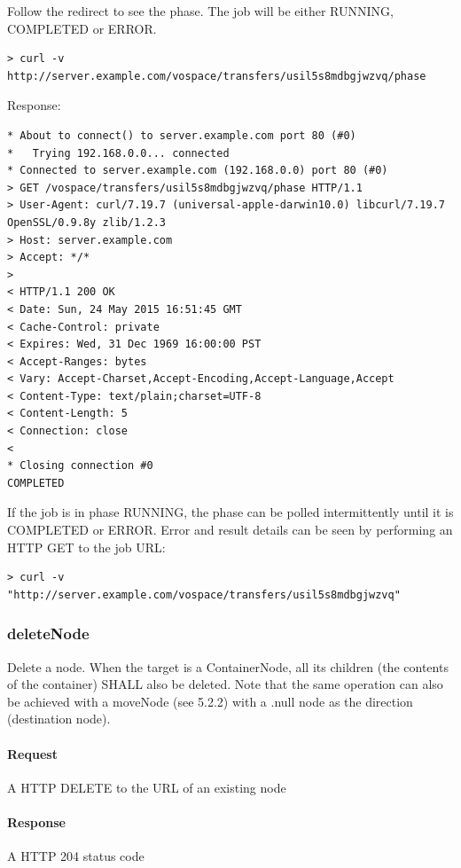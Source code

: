 \documentclass[11pt,a4paper]{ivoa}
\begin{document}
Follow the redirect to see the phase.  The job will be either RUNNING, COMPLETED or ERROR.
\begin{lstlisting}
> curl -v http://server.example.com/vospace/transfers/usil5s8mdbgjwzvq/phase
\end{lstlisting}
Response:
\begin{lstlisting}
* About to connect() to server.example.com port 80 (#0)
*   Trying 192.168.0.0... connected
* Connected to server.example.com (192.168.0.0) port 80 (#0)
> GET /vospace/transfers/usil5s8mdbgjwzvq/phase HTTP/1.1
> User-Agent: curl/7.19.7 (universal-apple-darwin10.0) libcurl/7.19.7 OpenSSL/0.9.8y zlib/1.2.3
> Host: server.example.com
> Accept: */*
>
< HTTP/1.1 200 OK
< Date: Sun, 24 May 2015 16:51:45 GMT
< Cache-Control: private
< Expires: Wed, 31 Dec 1969 16:00:00 PST
< Accept-Ranges: bytes
< Vary: Accept-Charset,Accept-Encoding,Accept-Language,Accept
< Content-Type: text/plain;charset=UTF-8
< Content-Length: 5
< Connection: close
<
* Closing connection #0
COMPLETED
\end{lstlisting}
If the job is in phase RUNNING, the phase can be polled intermittently until it is COMPLETED or ERROR.
Error and result details can be seen by performing an HTTP GET to the job URL:
\begin{lstlisting}
> curl -v "http://server.example.com/vospace/transfers/usil5s8mdbgjwzvq"
\end{lstlisting}

\subsubsection{deleteNode}
\label{subsubsec:deletenode}
Delete a node.
When the target is a ContainerNode, all its children (the contents of the container) SHALL also be deleted.
Note that the same operation can also be achieved with a moveNode (see 5.2.2) with a .null node as the direction (destination node).

\paragraph{Request}
A HTTP DELETE to the URL of an existing node

\paragraph{Response}
A HTTP 204 status code
\end{document}
